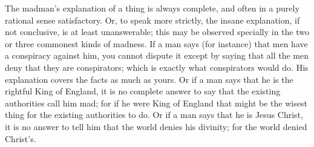 The madman’s explanation of a thing is always complete, and often in a purely rational sense satisfactory. Or, to speak more strictly, the insane explanation, if not conclusive, is at least unanswerable; this may be observed specially in the two or three commonest kinds of madness. If a man says (for instance) that men have a conspiracy against him, you cannot dispute it except by saying that all the men deny that they are conspirators; which is exactly what conspirators would do. His explanation covers the facts as much as yours. Or if a man says that he is the rightful King of England, it is no complete answer to say that the existing authorities call him mad; for if he were King of England that might be the wisest thing for the existing authorities to do. Or if a man says that he is Jesus Christ, it is no answer to tell him that the world denies his divinity; for the world denied Christ’s.

